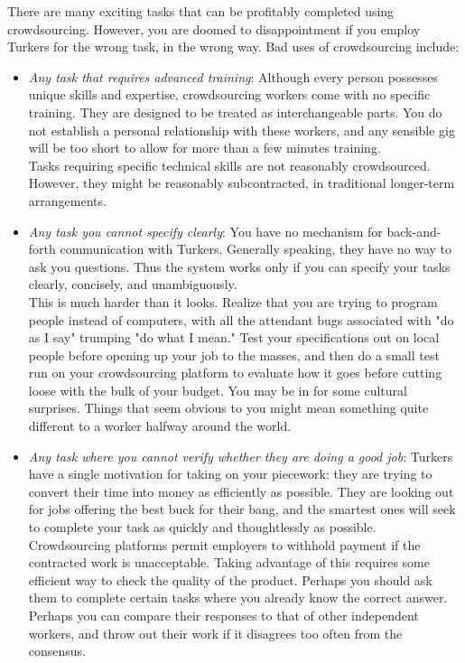 \documentclass[10pt]{article}
\begin{document}
There are many exciting tasks that can be profitably completed using crowdsourcing. However, you are doomed to disappointment if you employ Turkers for the wrong task, in the wrong way. Bad uses of crowdsourcing include:

\begin{itemize}
    \item \textit{Any task that requires advanced training}: Although every person possesses unique skills and expertise, crowdsourcing workers come with no specific training. They are designed to be treated as interchangeable parts. You do not establish a personal relationship with these workers, and any sensible gig will be too short to allow for more than a few minutes training.\\
    Tasks requiring specific technical skills are not reasonably crowdsourced. However, they might be reasonably subcontracted, in traditional longer-term arrangements.
    \item \textit{Any task you cannot specify clearly}: You have no mechanism for back-and-forth communication with Turkers. Generally speaking, they have no way to ask you questions. Thus the system works only if you can specify your tasks clearly, concisely, and unambiguously.\\
    This is much harder than it looks. Realize that you are trying to program people instead of computers, with all the attendant bugs associated with "do as I say" trumping "do what I mean." Test your specifications out on local people before opening up your job to the masses, and then do a small test run on your crowdsourcing platform to evaluate how it goes before cutting loose with the bulk of your budget. You may be in for some cultural surprises. Things that seem obvious to you might mean something quite different to a worker halfway around the world.
    \item \textit{Any task where you cannot verify whether they are doing a good job}: Turkers have a single motivation for taking on your piecework: they are trying to convert their time into money as efficiently as possible. They are looking out for jobs offering the best buck for their bang, and the smartest ones will seek to complete your task as quickly and thoughtlessly as possible.\\
    Crowdsourcing platforms permit employers to withhold payment if the contracted work is unacceptable. Taking advantage of this requires some efficient way to check the quality of the product. Perhaps you should ask them to complete certain tasks where you already know the correct answer. Perhaps you can compare their responses to that of other independent workers, and throw out their work if it disagrees too often from the consensus.
\end{itemize}
\end{document}
